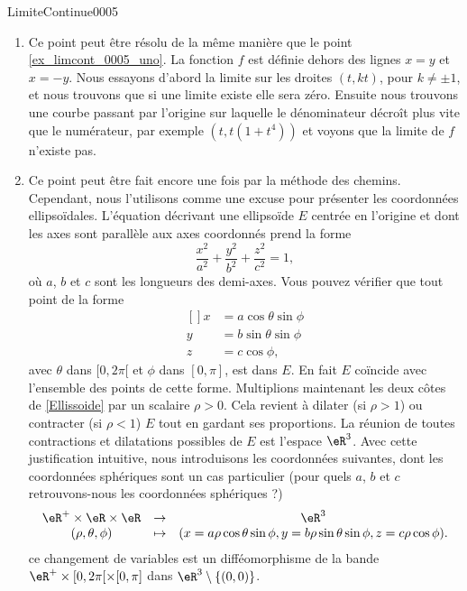 \begin{corrige}{LimiteContinue0005}
\begin{enumerate}
                            \item Ce point peut être résolu de la même manière que le point \ref{ex_limcont_0005_uno}. La fonction $f$ est définie dehors des lignes $x=y$ et $x=-y$.  Nous essayons d'abord la limite sur les droites $(t,kt)$, pour $k\neq \pm 1$, et nous trouvons que si une limite existe elle sera zéro. Ensuite nous trouvons une courbe passant par l'origine sur laquelle le dénominateur décroît plus vite que le numérateur, par exemple $(t, t(1+t^4))$ et voyons que la limite de $f$ n'existe pas.
                              \item Ce point peut être fait encore une fois par la méthode des chemins. Cependant, nous l'utilisons comme une excuse pour présenter les coordonnées ellipsoïdales.  L'équation décrivant une ellipsoïde $E$ centrée en l'origine et dont les axes sont parallèle aux axes coordonnés prend la forme 
                                \begin{equation}\label{Ellissoide}
                                  \frac{x^2}{a^2}+\frac{y^2}{b^2}+\frac{z^2}{c^2}=1,
                                \end{equation}
                                où $a$, $b$ et $c$ sont les longueurs des demi-axes. Vous pouvez vérifier que tout point de la forme  
				\begin{equation}
					\begin{aligned}[]
                                    		x&=a\cos\theta\sin\phi\\
						y&=b\sin\theta\sin\phi\\
						z&=c\cos\phi,
					\end{aligned}
				\end{equation}
                                avec  $\theta$ dans $[0,2\pi[$ et $\phi$ dans $[0,\pi]$, est dans $E$. En fait $E$ coïncide avec l'ensemble des points de cette forme. Multiplions maintenant les  deux côtes de \eqref{Ellissoide} par un scalaire $\rho>0$. Cela revient à  dilater (si $\rho >1$) ou contracter (si $\rho <1$) $E$ tout en gardant ses proportions. La réunion de toutes contractions et dilatations possibles de $E$ est l'espace $\eR^3$.  Avec cette justification intuitive, nous  introduisons les coordonnées suivantes, dont les coordonnées sphériques sont un cas particulier (pour quels $a$, $b$ et $c$ retrouvons-nous les coordonnées sphériques ?)
                                    \begin{equation}
                                      \begin{array}{ccc}
                                        \eR^+\times \eR\times \eR& \to& \eR^3\\ 
                                       (\rho, \theta,\phi )&\mapsto&( x=a\rho\cos\theta\sin\phi, y=b\rho\sin\theta\sin\phi, z=c\rho\cos\phi).
                                      \end{array}
                                      \end{equation}
                                    ce changement de variables est un difféomorphisme de la bande $ \eR^+\times [0,2\pi[\times[0,\pi]$ dans $\eR^3\setminus\{(0,0)\}$.


\end{enumerate}
\end{corrige}
